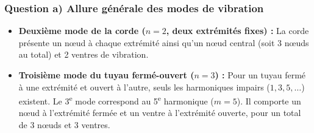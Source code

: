 \subsubsection*{Question a) Allure générale des modes de vibration}

\begin{itemize}
    \item \textbf{Deuxième mode de la corde ($n = 2$, deux extrémités fixes) :} 
    La corde présente un nœud à chaque extrémité ainsi qu'un nœud central (soit 3 nœuds au total) et 2 ventres de vibration.
    
    \item \textbf{Troisième mode du tuyau fermé-ouvert ($n = 3$) :} 
    Pour un tuyau fermé à une extrémité et ouvert à l'autre, seuls les harmoniques impairs ($1, 3, 5, \dots$) existent. Le 3\textsuperscript{e} mode correspond au 5\textsuperscript{e} harmonique ($m = 5$). Il comporte un nœud à l'extrémité fermée et un ventre à l'extrémité ouverte, pour un total de 3 nœuds et 3 ventres.
\end{itemize}

